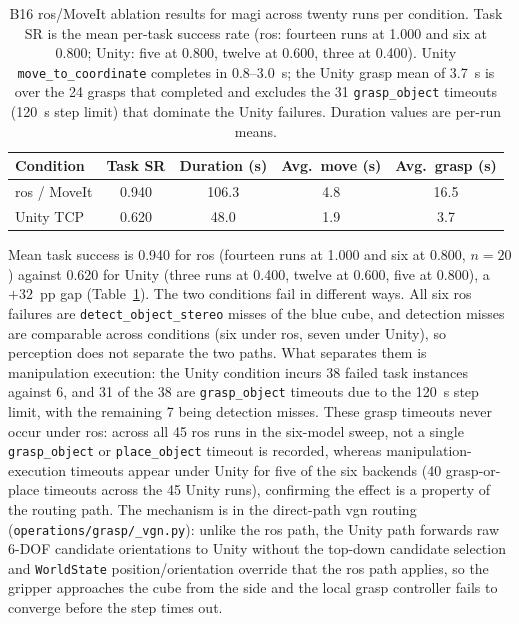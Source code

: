 \begin{table}[t]
	\centering
	\begin{tabular}{lcccc}
		\hline
		\textbf{Condition}    & \textbf{Task SR}        &
		\textbf{Duration (s)} & \textbf{Avg.\ move (s)} & \textbf{Avg.\ grasp (s)}              \\
		\hline
		\gls{ros} / MoveIt    & 0.940                   & 106.3                    & 4.8 & 16.5 \\
		Unity TCP             & 0.620                   & 48.0                     & 1.9 & 3.7  \\
		\hline
	\end{tabular}
	\caption{B16 \gls{ros}/MoveIt ablation results for \gls{magi} across twenty runs per condition. Task SR is the mean per-task success rate (\gls{ros}: fourteen runs at 1.000 and six at 0.800; Unity: five at 0.800, twelve at 0.600, three at 0.400). Unity \texttt{move\_to\_coordinate} completes in 0.8–3.0~s; the Unity grasp mean of 3.7~s is over the 24 grasps that completed and excludes the 31 \texttt{grasp\_object} timeouts (120~s step limit) that dominate the Unity failures. Duration values are per-run means.}
	\label{tab:b16-results}
\end{table}

Mean task success is 0.940 for \gls{ros} (fourteen runs at 1.000 and six at 0.800, $n = 20$) against 0.620 for Unity (three runs at 0.400, twelve at 0.600, five at 0.800), a $+32$~pp gap (Table~\ref{tab:b16-results}). The two conditions fail in different ways. All six \gls{ros} failures are \texttt{detect\_object\_stereo} misses of the blue cube, and detection misses are comparable across conditions (six under \gls{ros}, seven under Unity), so perception does not separate the two paths. What separates them is manipulation execution: the Unity condition incurs 38 failed task instances against 6, and 31 of the 38 are \texttt{grasp\_object} timeouts due to the 120~s step limit, with the remaining 7 being detection misses. These grasp timeouts never occur under \gls{ros}: across all 45 \gls{ros} runs in the six-model sweep, not a single \texttt{grasp\_object} or \texttt{place\_object} timeout is recorded, whereas manipulation-execution timeouts appear under Unity for five of the six backends (40 grasp-or-place timeouts across the 45 Unity runs), confirming the effect is a property of the routing path. The mechanism is in the direct-path \gls{vgn} routing (\texttt{operations/grasp/\_vgn.py}): unlike the \gls{ros} path, the Unity path forwards raw 6-DOF candidate orientations to Unity without the top-down candidate selection and \texttt{WorldState} position/orientation override that the \gls{ros} path applies, so the gripper approaches the cube from the side and the local grasp controller fails to converge before the step times out.

